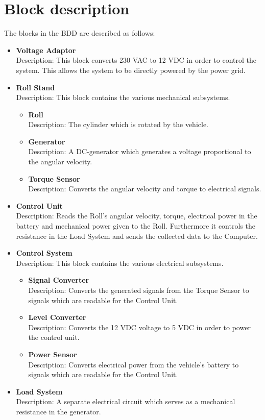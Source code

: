 \section{Block description}
The blocks in the BDD are described as follows:
\begin{itemize}
	\item \textbf{Voltage Adaptor}\\
	Description: This block converts 230 VAC to 12 VDC in order to control the system. This allows the system to be directly powered by the power grid.
	\item \textbf{Roll Stand}\\
	Description: This block contains the various mechanical subsystems.
	\begin{itemize}
		\item \textbf{Roll}\\
		Description: The cylinder which is rotated by the vehicle.
		\item \textbf{Generator}\\
		Description: A DC-generator which generates a voltage proportional to the angular velocity.
		\item \textbf{Torque Sensor}\\
		Description: Converts the angular velocity and torque to electrical signals.
	\end{itemize}
	\item \textbf{Control Unit}\\
	Description: Reads the Roll's angular velocity, torque, electrical power in the battery and mechanical power given to the Roll. Furthermore it controls the resistance in the Load System and sends the collected data to the Computer.
	\item \textbf{Control System}\\
	Description: This block contains the various electrical subsystems.
	\begin{itemize}
		\item \textbf{Signal Converter}\\
		Description: Converts the generated signals from the Torque Sensor to signals which are readable for the Control Unit.
		\item \textbf{Level Converter}\\
		Description: Converts the 12 VDC voltage to 5 VDC in order to power the control unit.
		\item \textbf{Power Sensor}\\
		Description: Converts electrical power from the vehicle's battery to signals which are readable for the Control Unit.
	\end{itemize}
	\item \textbf{Load System}\\
	Description: A separate electrical circuit which serves as a mechanical resistance in the generator.
\end{itemize}